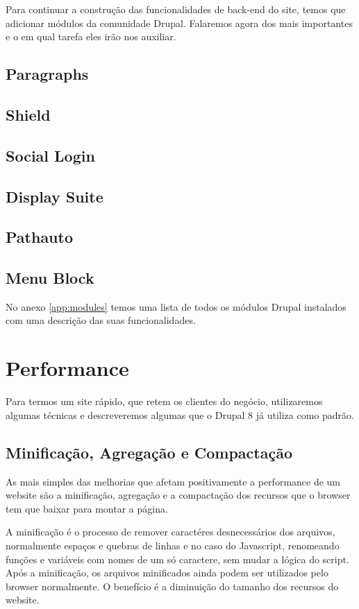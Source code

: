 \documentclass[
	12pt,				%
    oneside,			%
	a4paper,			%
	english,			%
	french,				%
	spanish,			%
	brazil				%
	]{abntex2}
\begin{document}
Para continuar a construção das funcionalidades de back-end do site, temos que adicionar módulos da comunidade Drupal. Falaremos agora dos mais importantes e o em qual tarefa eles irão nos auxiliar.

\subsection{Paragraphs}
\subsection{Shield}
\subsection{Social Login}
\subsection{Display Suite}
\subsection{Pathauto}
\subsection{Menu Block}

No anexo \ref{app:modules} temos uma lista de todos os módulos Drupal instalados com uma descrição das suas funcionalidades.

\section{Performance}

Para termos um site rápido, que retem os clientes do negócio, utilizaremos algumas técnicas e descreveremos algumas que o Drupal 8 já utiliza como padrão.

\subsection{Minificação, Agregação e Compactação}
As mais simples das melhorias que afetam positivamente a performance de um website são a minificação, agregação e a compactação dos recursos que o browser tem que baixar para montar a página. 

A minificação é o processo de remover caractéres desnecessários dos arquivos, normalmente espaços e quebras de linhas e no caso do Javascript, renomeando funções e variáveis com nomes de um só caractere, sem mudar a lógica do script. Após a minificação, os arquivos minificados ainda podem ser utilizados pelo browser normalmente. O benefício é a diminuição do tamanho dos recursos do website.
\end{document}
